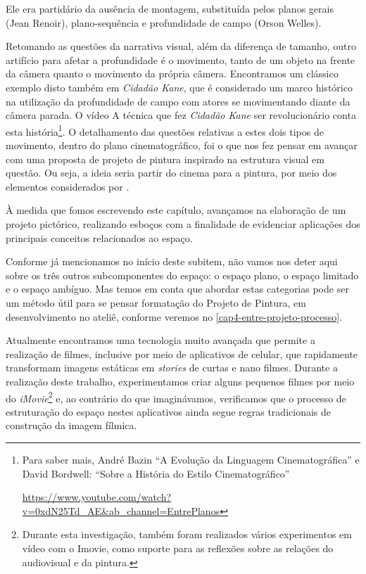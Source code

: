 Ele era partidário da ausência de montagem, substituída pelos planos
gerais (Jean Renoir), plano-sequência e profundidade de campo (Orson
Welles).

Retomando as questões da narrativa visual, além da diferença de
tamanho, outro artifício para afetar a profundidade é o movimento,
tanto de um objeto na frente da câmera quanto o movimento da própria
câmera. Encontramos um clássico exemplo disto também em \emph{Cidadão
	Kane}, que é considerado um marco histórico na utilização da
profundidade de campo com atores se movimentando diante da câmera
parada. O vídeo A técnica que fez \emph{Cidadão Kane} ser
revolucionário conta esta história\footnote{Para saber mais, André
	Bazin \enquote{A Evolução da Linguagem Cinematográfica} e David
	Bordwell: \enquote{Sobre a História do Estilo Cinematográfico}

	\url{https://www.youtube.com/watch?v=0xdN25Td_AE\&ab_channel=EntrePlanos}}.
O detalhamento das questões relativas a estes dois tipos de movimento,
dentro do plano cinematográfico, foi o que nos fez pensar em avançar com
uma proposta de projeto de pintura inspirado na estrutura visual em
questão. Ou seja, a ideia seria partir do cinema para a pintura, por
meio dos elementos considerados por \citeauthor{block2021visual}.

À medida que fomos escrevendo este capítulo, avançamos na elaboração de
um projeto pictórico, realizando esboços com a finalidade de evidenciar
aplicações dos principais conceitos relacionados ao espaço.

Conforme já mencionamos no início deste subitem, não vamos nos deter
aqui sobre os três outros subcomponentes do espaço: o espaço plano, o
espaço limitado e o espaço ambíguo. Mas temos em conta que abordar
estas categorias pode ser um método útil para se pensar formatação do
Projeto de Pintura, em desenvolvimento no ateliê, conforme veremos no
\cref{cap4-entre-projeto-processo}.

Atualmente encontramos uma tecnologia muito avançada que permite a
realização de filmes, inclusive por meio de aplicativos de celular, que
rapidamente transformam imagens estáticas em \emph{stories} de curtas e
nano filmes. Durante a realização deste trabalho, experimentamos criar
alguns pequenos filmes por meio do \emph{iMovie}\footnote{Durante esta
	investigação, também foram realizados vários experimentos em vídeo com
	o Imovie, como suporte para as reflexões sobre as relações do
	audiovisual e da pintura.} e, ao contrário do que imaginávamos,
verificamos que o processo de estruturação do espaço nestes aplicativos
ainda segue regras tradicionais de construção da imagem fílmica.

